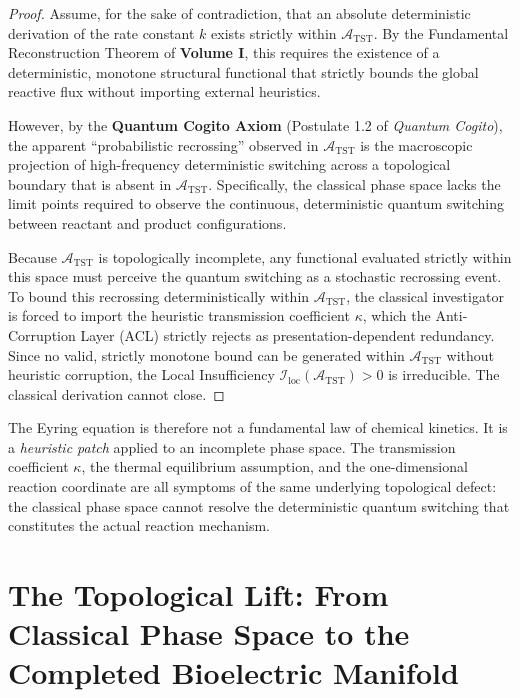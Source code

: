 \documentclass[11pt,openany]{extbook}
\theoremstyle{plain}
\theoremstyle{definition}
\begin{document}
\begin{proof}
Assume, for the sake of contradiction, that an absolute deterministic derivation of the rate constant $k$ exists strictly within $\mathcal{A}_{\mathrm{TST}}$. By the Fundamental Reconstruction Theorem of \textbf{Volume I}, this requires the existence of a deterministic, monotone structural functional that strictly bounds the global reactive flux without importing external heuristics.

However, by the \textbf{Quantum Cogito Axiom} (Postulate 1.2 of \emph{Quantum Cogito}), the apparent ``probabilistic recrossing'' observed in $\mathcal{A}_{\mathrm{TST}}$ is the macroscopic projection of high-frequency deterministic switching across a topological boundary that is absent in $\mathcal{A}_{\mathrm{TST}}$. Specifically, the classical phase space lacks the limit points required to observe the continuous, deterministic quantum switching between reactant and product configurations.

Because $\mathcal{A}_{\mathrm{TST}}$ is topologically incomplete, any functional evaluated strictly within this space must perceive the quantum switching as a stochastic recrossing event. To bound this recrossing deterministically within $\mathcal{A}_{\mathrm{TST}}$, the classical investigator is forced to import the heuristic transmission coefficient $\kappa$, which the Anti-Corruption Layer (ACL) strictly rejects as presentation-dependent redundancy. Since no valid, strictly monotone bound can be generated within $\mathcal{A}_{\mathrm{TST}}$ without heuristic corruption, the Local Insufficiency $\mathcal{I}_{\mathrm{loc}}(\mathcal{A}_{\mathrm{TST}}) > 0$ is irreducible. The classical derivation cannot close.
\end{proof}

\noindent The Eyring equation is therefore not a fundamental law of chemical kinetics. It is a \emph{heuristic patch} applied to an incomplete phase space. The transmission coefficient $\kappa$, the thermal equilibrium assumption, and the one-dimensional reaction coordinate are all symptoms of the same underlying topological defect: the classical phase space cannot resolve the deterministic quantum switching that constitutes the actual reaction mechanism.

\section{The Topological Lift: From Classical Phase Space to the Completed Bioelectric Manifold}
\end{document}
